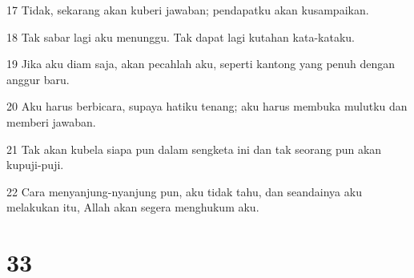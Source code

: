 \par 17 Tidak, sekarang akan kuberi jawaban; pendapatku akan kusampaikan.
\par 18 Tak sabar lagi aku menunggu. Tak dapat lagi kutahan kata-kataku.
\par 19 Jika aku diam saja, akan pecahlah aku, seperti kantong yang penuh dengan anggur baru.
\par 20 Aku harus berbicara, supaya hatiku tenang; aku harus membuka mulutku dan memberi jawaban.
\par 21 Tak akan kubela siapa pun dalam sengketa ini dan tak seorang pun akan kupuji-puji.
\par 22 Cara menyanjung-nyanjung pun, aku tidak tahu, dan seandainya aku melakukan itu, Allah akan segera menghukum aku.

\chapter{33}

